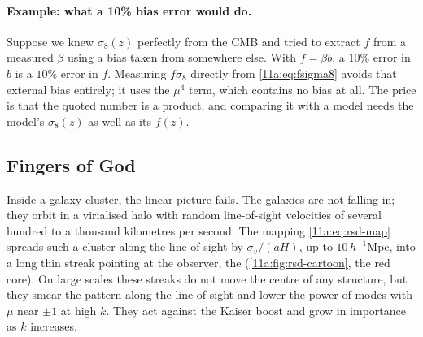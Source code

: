 \paragraph{Example: what a 10\% bias error would do.}
Suppose we knew $\sigma_8(z)$ perfectly from the CMB and tried to extract $f$
from a measured $\beta$ using a bias taken from somewhere else. With
$f=\beta b$, a $10\%$ error in $b$ is a $10\%$ error in $f$. Measuring
$f\sigma_8$ directly from \eqref{11a:eq:fsigma8} avoids that external bias
entirely; it uses the $\mu^4$ term, which contains no bias at all. The price is
that the quoted number is a product, and comparing it with a model needs the
model's $\sigma_8(z)$ as well as its $f(z)$.

\subsection{Fingers of God}
\label{11a:sec:fog}

Inside a galaxy cluster, the linear picture fails. The galaxies are not
falling in; they orbit in a virialised halo with random line-of-sight velocities
of several hundred to a thousand kilometres per second. The mapping
\eqref{11a:eq:rsd-map} spreads such a cluster along the line of sight by
$\sigma_v/(aH)$, up to $10\,h^{-1}$Mpc, into a long thin streak pointing at the
observer, the  (\cref{11a:fig:rsd-cartoon}, the red core).
On large scales these streaks do not move the centre of any structure, but they
smear the pattern along the line of sight and lower the power of modes with
$\mu$ near $\pm1$ at high $k$. They act against the Kaiser boost and grow in
importance as $k$ increases.

